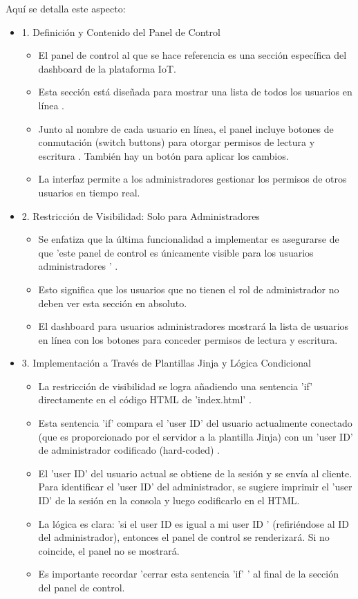 \documentclass{report}
\begin{document}
Aquí se detalla este aspecto:
\begin{itemize}
    \item 1. Definición y Contenido del Panel de Control
    \begin{itemize}
        \item El panel de control al que se hace referencia es una sección específica del dashboard de la plataforma IoT.
        \item Esta sección está diseñada para mostrar una  lista de todos los usuarios en línea .
        \item Junto al nombre de cada usuario en línea, el panel incluye  botones de conmutación (switch buttons)  para  otorgar permisos de lectura y 
        escritura . También hay un botón para aplicar los cambios.
        \item La interfaz permite a los administradores gestionar los permisos de otros usuarios en tiempo real.
    \end{itemize}

    \item 2. Restricción de Visibilidad: Solo para Administradores
    \begin{itemize}
        \item Se enfatiza que la última funcionalidad a implementar es asegurarse de que   'este panel de control es únicamente visible para los 
        usuarios administradores ' .
        \item Esto significa que los usuarios que no tienen el rol de administrador no deben ver esta sección en absoluto.
        \item El dashboard para usuarios administradores mostrará la lista de usuarios en línea con los botones para conceder permisos de lectura y escritura.    
    \end{itemize}

    \item 3. Implementación a Través de Plantillas Jinja y Lógica Condicional
    \begin{itemize}
        \item La restricción de visibilidad se logra añadiendo una  sentencia 'if' directamente en el código HTML de 'index.html' .
        \item Esta sentencia 'if' compara el 'user ID' del usuario actualmente conectado (que es proporcionado por el servidor a la plantilla Jinja) 
        con un  'user ID' de administrador codificado (hard-coded) .
        \item El 'user ID' del usuario actual se obtiene de la sesión y se envía al cliente. Para identificar el 'user ID' del administrador, se 
        sugiere imprimir el 'user ID' de la sesión en la consola y luego codificarlo en el HTML.
        \item La lógica es clara:   'si el user ID es igual a mi user ID '  (refiriéndose al ID del administrador), entonces el panel de control se 
        renderizará. Si no coincide, el panel no se mostrará.
        \item Es importante recordar   'cerrar esta sentencia 'if' '  al final de la sección del panel de control.    
    \end{itemize}


\end{itemize}
\end{document}
